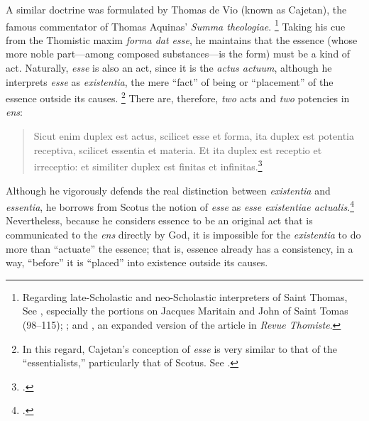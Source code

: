A similar doctrine was formulated by Thomas de Vio (known as Cajetan), the famous commentator of Thomas Aquinas’ \emph{Summa theologiae}.%
%
\footnote{Regarding late-Scholastic and neo-Scholastic interpreters of Saint Thomas, See \cite{contat:figure}, especially the portions on Jacques Maritain and John of Saint Tomas (98–115); \cite{fabro:obscurcissement}; and \cite[604–628]{fabro:partecipazione}, an expanded version of the article in \emph{Revue Thomiste}.} Taking his cue from the Thomistic maxim \emph{forma dat esse}, he maintains that the essence (whose more noble part—among composed substances—is the form) must be a kind of act. Naturally, \emph{esse} is also an act, since it is the \emph{actus actuum}, although he interprets \emph{esse} as \emph{existentia}, the mere “fact” of being or “placement” of the essence outside its causes.%
%
\footnote{In this regard, Cajetan’s conception of \emph{esse} is very similar to that of the “essentialists,” particularly that of Scotus. See \cite[272]{gilson:cajetan}.} There are, therefore, \emph{two} acts and \emph{two} potencies in \emph{ens}:
%
\begin{quotation}
Sicut enim duplex est actus, scilicet esse et forma, ita duplex est potentia receptiva, scilicet essentia et materia. Et ita duplex est receptio et irreceptio: et similiter duplex est finitas et infinitas.\footcite[73b, X]{cajetan:commentaries}
\end{quotation}
%
Although he vigorously defends the real distinction between \emph{existentia} and \emph{essentia}, he borrows from Scotus the notion of \emph{esse} as \emph{esse existentiae actualis}.\footcite[272–273]{gilson:cajetan} Nevertheless, because he considers essence to be an original act that is communicated to the \emph{ens} directly by God, it is impossible for the \emph{existentia} to do more than “actuate” the essence; that is, essence already has a consistency, in a way, “before” it is “placed” into existence outside its causes.%
%
